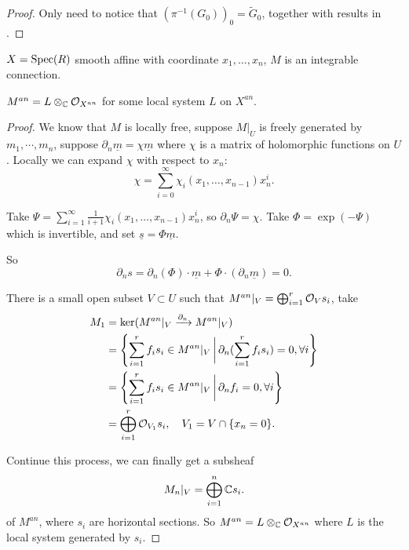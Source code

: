 \begin{proof}
  Only need to notice that $(\pi^{-1}(G_0))_0 = \widetilde{G}_0$, together with results in \cite{Sch87}.
\end{proof}










$X = \operatorname{Spec}(R)$ smooth affine with coordinate $x_1,\ldots,x_n$, $M$ is an integrable connection.

\begin{thm}
  $M^{an} = L \otimes_{\mathbb{C}} \mathcal{O}_{X^{an}}$ for some local system $L$ on $X^{an}$.
\end{thm}

\begin{proof}
  We know that $M$ is locally free, suppose $M|_{U}$ is freely generated by $m_1,\cdots,m_n$, suppose $\partial_n \underline{m} = \chi \underline{m}$ where $\chi$ is a matrix of holomorphic functions on $U$. Locally we can expand $\chi$ with respect to $x_n$:
  \[\chi = \sum_{i=0}^{\infty} \chi_i(x_1,\ldots,x_{n-1}) x_n^i.\]

  Take $\Psi = \sum_{i=1}^{\infty} \frac{1}{i+1}\chi_i(x_1,\ldots,x_{n-1}) x_n^i$, so $\partial_n \Psi = \chi$. Take $\Phi = \exp(-\Psi)$ which is invertible, and set $\underline{s} = \Phi \underline{m}$.

  So \[\partial_n s = \partial_n(\Phi) \cdot \underline{m} + \Phi \cdot  (\partial_n \underline{m}) = 0.\]

  There is a small open subset $V \subset U$ such that $M^{an}|_{V} = \bigoplus_{i=1}^{r} \mathcal{O}_V s_i$, take
  \begin{align*}
    M_1 &= \ker(M^{an}|_{V} \xrightarrow{\partial_n} M^{an}|_{V}) \\
    &= \Biggl\{\sum_{i=1}^{r} f_i s_i \in M^{an}|_{V}\,\bigg\lvert\,\partial_n (\sum_{i=1}^{r} f_i s_i) = 0, \forall i\Biggr\}\\
    & = \Biggl\{\sum_{i=1}^{r} f_i s_i \in M^{an}|_{V}\,\bigg\lvert\,\partial_n f_i = 0, \forall i\Biggr\}\\
    & = \bigoplus_{i=1}^{r} \mathcal{O}_{V_1} s_i, \quad V_1 = V \cap \{x_n = 0\}.
  \end{align*}

  Continue this process, we can finally get a subsheaf
  \[M_n|_V = \bigoplus_{i=1}^n \mathbb{C} s_i.\] of $M^{an}$, where $s_i$ are horizontal sections. So $M^{an} = L \otimes_{\mathbb{C}} \mathcal{O}_{X^{an}}$ where $L$ is the local system generated by $s_i$.

\end{proof}

